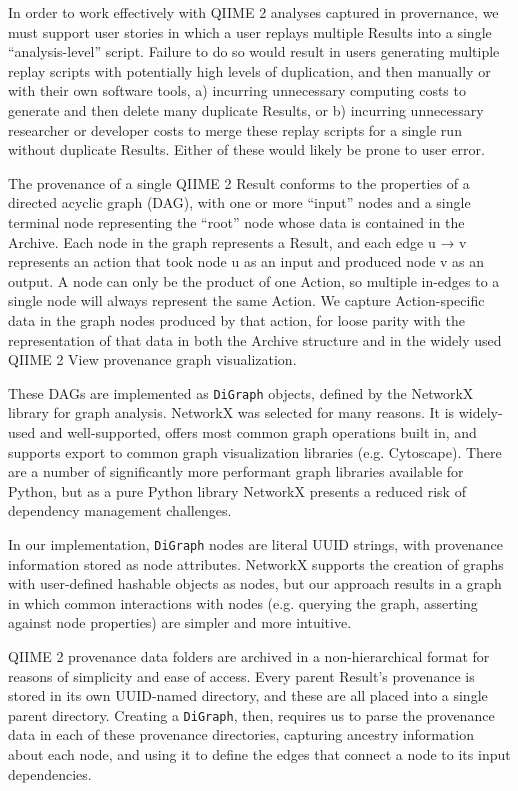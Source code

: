 In order to work effectively with QIIME 2 analyses captured in provernance,
we must support user stories in which a user replays multiple Results into a
single “analysis-level” script. Failure to do so would result in users
generating multiple replay scripts with potentially high levels of duplication,
and then manually or with their own software tools, a) incurring unnecessary
computing costs to generate and then delete many duplicate Results, or b)
incurring unnecessary researcher or developer costs to merge these replay
scripts for a single run without duplicate Results. Either of these would likely
be prone to user error.

The provenance of a single QIIME 2 Result conforms to the properties of a
directed acyclic graph (DAG), with one or more “input” nodes and a single
terminal node representing the “root” node whose data is contained in the
Archive. Each node in the graph represents a Result, and each edge u → v
represents an action that took node u as an input and produced node v as an
output. A node can only be the product of one Action, so multiple in-edges to a
single node will always represent the same Action. We capture Action-specific
data in the graph nodes produced by that action, for loose parity with the
representation of that data in both the Archive structure and in the widely used
QIIME 2 View provenance graph visualization.

These DAGs are implemented as \texttt{DiGraph} objects, defined by the NetworkX library
for graph analysis. NetworkX was selected for many reasons. It is widely-used
and well-supported, offers most common graph operations built in, and supports
export to common graph visualization libraries (e.g. Cytoscape). There are a
number of significantly more performant graph libraries available for Python,
but as a pure Python library NetworkX presents a reduced risk of dependency
management challenges.

In our implementation, \texttt{DiGraph} nodes are literal UUID strings, with provenance
information stored as node attributes. NetworkX supports the creation of graphs
with user-defined hashable objects as nodes, but our approach results in a graph
in which common interactions with nodes (e.g. querying the graph, asserting
against node properties) are simpler and more intuitive.

QIIME 2 provenance data folders are archived in a non-hierarchical format for
reasons of simplicity and ease of access. Every parent Result’s provenance is
stored in its own UUID-named directory, and these are all placed into a single
parent directory. Creating a \texttt{DiGraph}, then, requires us to parse the provenance
data in each of these provenance directories, capturing ancestry information
about each node, and using it to define the edges that connect a node to its
input dependencies.


